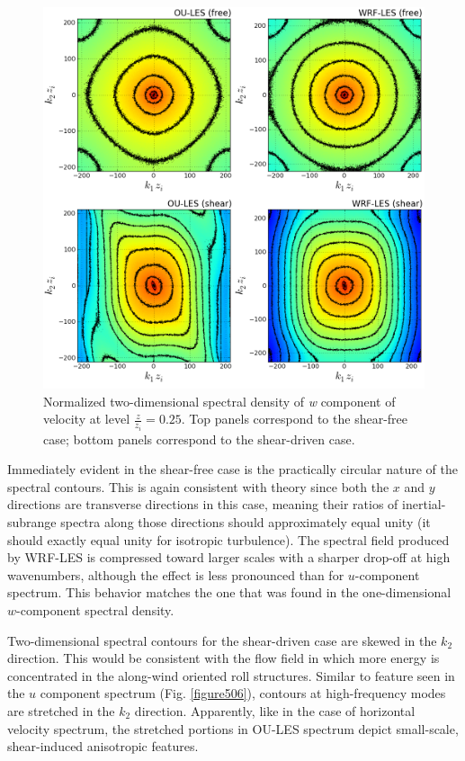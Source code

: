 \begin{figure}[!ht]
\begin{center}
\includegraphics[width=\textwidth]{figures/chapter5/spectra2D_w}
\end{center}
\caption{Normalized two-dimensional spectral density of \textit{w} component of velocity at level $\frac{z}{z_i}=0.25$. Top panels correspond to the shear-free case; bottom panels correspond to the shear-driven case.}
\label{figure507}
\end{figure}


Immediately evident in the shear-free case is the practically circular nature of the spectral contours. This is again consistent with theory since both the $x$ and $y$ directions are transverse directions in this case, meaning their ratios of inertial-subrange spectra along those directions should approximately equal unity (it should exactly equal unity for isotropic turbulence). The spectral field produced by WRF-LES is compressed toward larger scales with a sharper drop-off at high wavenumbers, although the effect is less pronounced than for $u$-component spectrum. This behavior matches the one that was found in the one-dimensional $w$-component spectral density.

Two-dimensional spectral contours for the shear-driven case are skewed in the $k_2$ direction. This would be consistent with the flow field in which more energy is concentrated in the along-wind oriented roll structures. Similar to feature seen in the $u$ component spectrum (Fig. \autoref{figure506}), contours at high-frequency modes are stretched in the $k_2$ direction. Apparently, like in the case of horizontal velocity spectrum, the stretched portions in OU-LES spectrum depict small-scale, shear-induced anisotropic features.

